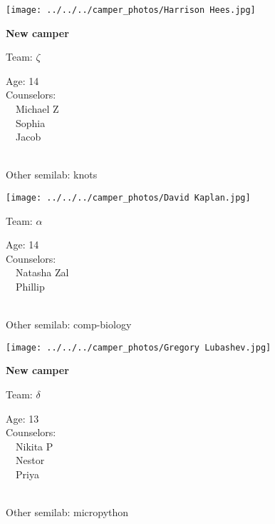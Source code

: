 \documentclass[10pt,letterpaper, landscape]{article}
\begin{document}
\horizontalshiftfornextsticker
\renewcommand{\baselinestretch}{1} \begin{sticker}
\noindent\begin{minipage}{0.5\textwidth}\texttt{[image: ../../../camper\_photos/Harrison Hees.jpg]}\end{minipage}\begin{minipage}{0.45\textwidth}
\textbf{New camper} 

Team: {\Large $\zeta$}

Age:        14\\
Counselors: \\\ \ Michael Z\\\ \ Sophia\\\ \ Jacob\\
\end{minipage} \\ \vspace{0.07in}
Other semilab: knots
\end{sticker}
\verticalshiftfornextsticker
\renewcommand{\baselinestretch}{1} \begin{sticker}
\noindent\begin{minipage}{0.5\textwidth}\texttt{[image: ../../../camper\_photos/David Kaplan.jpg]}\end{minipage}\begin{minipage}{0.45\textwidth}
Team: {\Large $\alpha$}

Age:        14\\
Counselors: \\\ \ Natasha Zal\\\ \ Phillip\\
\end{minipage} \\ \vspace{0.07in}
Other semilab: comp-biology
\end{sticker}
\horizontalshiftfornextsticker
\renewcommand{\baselinestretch}{1} \begin{sticker}
\noindent\begin{minipage}{0.5\textwidth}\texttt{[image: ../../../camper\_photos/Gregory Lubashev.jpg]}\end{minipage}\begin{minipage}{0.45\textwidth}
\textbf{New camper} 

Team: {\Large $\delta$}

Age:        13\\
Counselors: \\\ \ Nikita P\\\ \ Nestor\\\ \ Priya\\
\end{minipage} \\ \vspace{0.07in}
Other semilab: micropython
\end{sticker}
\end{document}
